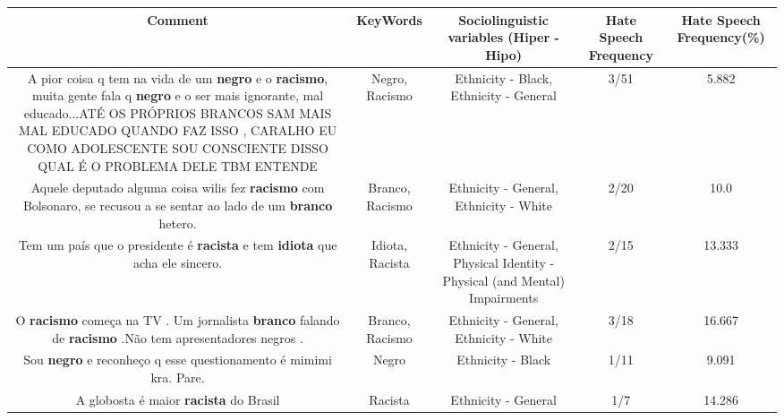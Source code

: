 \documentclass[11pt]{article}
\newlength\mylength
\begin{document}
\begin{center}
\setlength\mylength{\dimexpr\textwidth - 1\arrayrulewidth - 50\tabcolsep}
\begin{longtable}{|C{.65\mylength}|C{.30\mylength}|C{.12\mylength}|C{.12\mylength}|C{.12\mylength}|}
\hline
\textbf{Comment} & \textbf{KeyWords} & \textbf{Sociolinguistic variables (Hiper - Hipo)}  & \textbf{Hate Speech Frequency} & \textbf{Hate Speech Frequency(\%)} \\
\hline{}\small A pior coisa q tem na vida de um \textbf{negro} e o \textbf{racismo},  muita gente fala q \textbf{negro} e  o ser mais ignorante, mal educado...ATÉ OS PRÓPRIOS BRANCOS SAM MAIS MAL EDUCADO QUANDO FAZ ISSO , CARALHO EU COMO ADOLESCENTE SOU CONSCIENTE DISSO QUAL É O PROBLEMA DELE TBM ENTENDE\normalsize   & Negro, Racismo & Ethnicity - Black, Ethnicity - General & 3/51 & 5.882 \\  \hline
  \small Aquele deputado alguma coisa wilis fez \textbf{racismo} com Bolsonaro, se recusou a se sentar ao lado de um \textbf{branco} hetero.\normalsize   & Branco, Racismo & Ethnicity - General, Ethnicity - White & 2/20 & 10.0 \\  \hline
  \small Tem um país que o presidente é \textbf{racista} e tem \textbf{idiota} que acha ele sincero.\normalsize   & Idiota, Racista & Ethnicity - General, Physical Identity - Physical (and Mental) Impairments & 2/15 & 13.333 \\  \hline
  \small O \textbf{racismo} começa na TV . Um jornalista \textbf{branco} falando de \textbf{racismo} .Não tem  apresentadores negros .\normalsize   & Branco, Racismo & Ethnicity - General, Ethnicity - White & 3/18 & 16.667 \\  \hline
  \small Sou \textbf{negro} e reconheço q esse questionamento é mimimi kra. Pare.\normalsize   & Negro & Ethnicity - Black & 1/11 & 9.091 \\  \hline
  \small A globosta é maior \textbf{racista} do Brasil\normalsize   & Racista & Ethnicity - General & 1/7 & 14.286 \\  \hline

\end{longtable}
\end{center}
\end{document}

